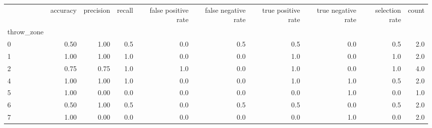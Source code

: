 \begin{tabular}{lrrrrrrrrr}
\toprule
{} &  accuracy &  precision &  recall &  false positive rate &  false negative rate &  true positive rate &  true negative rate &  selection rate &  count \\
throw\_zone &           &            &         &                      &                      &                     &                     &                 &        \\
\midrule
0          &      0.50 &       1.00 &     0.5 &                  0.0 &                  0.5 &                 0.5 &                 0.0 &             0.5 &    2.0 \\
1          &      1.00 &       1.00 &     1.0 &                  0.0 &                  0.0 &                 1.0 &                 0.0 &             1.0 &    2.0 \\
2          &      0.75 &       0.75 &     1.0 &                  1.0 &                  0.0 &                 1.0 &                 0.0 &             1.0 &    4.0 \\
4          &      1.00 &       1.00 &     1.0 &                  0.0 &                  0.0 &                 1.0 &                 1.0 &             0.5 &    2.0 \\
5          &      1.00 &       0.00 &     0.0 &                  0.0 &                  0.0 &                 0.0 &                 1.0 &             0.0 &    1.0 \\
6          &      0.50 &       1.00 &     0.5 &                  0.0 &                  0.5 &                 0.5 &                 0.0 &             0.5 &    2.0 \\
7          &      1.00 &       0.00 &     0.0 &                  0.0 &                  0.0 &                 0.0 &                 1.0 &             0.0 &    2.0 \\
\bottomrule
\end{tabular}
